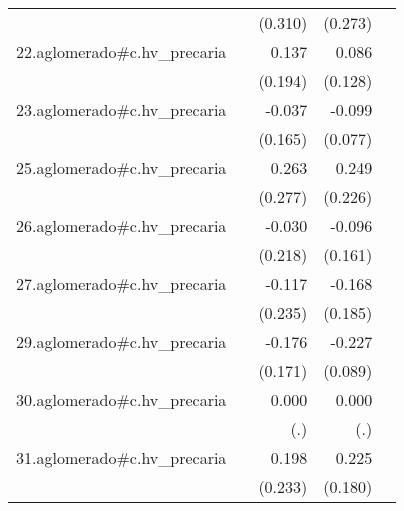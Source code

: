 {\begin{longtable}{l*{4}{D{.}{.}{-1}}}
            &                     &     (0.310)         &     (0.273)         &                     \\
\addlinespace
22.aglomerado#c.hv\_precaria&                     &       0.137         &       0.086         &                     \\
            &                     &     (0.194)         &     (0.128)         &                     \\
\addlinespace
23.aglomerado#c.hv\_precaria&                     &      -0.037         &      -0.099         &                     \\
            &                     &     (0.165)         &     (0.077)         &                     \\
\addlinespace
25.aglomerado#c.hv\_precaria&                     &       0.263         &       0.249         &                     \\
            &                     &     (0.277)         &     (0.226)         &                     \\
\addlinespace
26.aglomerado#c.hv\_precaria&                     &      -0.030         &      -0.096         &                     \\
            &                     &     (0.218)         &     (0.161)         &                     \\
\addlinespace
27.aglomerado#c.hv\_precaria&                     &      -0.117         &      -0.168         &                     \\
            &                     &     (0.235)         &     (0.185)         &                     \\
\addlinespace
29.aglomerado#c.hv\_precaria&                     &      -0.176         &      -0.227\sym{*}  &                     \\
            &                     &     (0.171)         &     (0.089)         &                     \\
\addlinespace
30.aglomerado#c.hv\_precaria&                     &       0.000         &       0.000         &                     \\
            &                     &         (.)         &         (.)         &                     \\
\addlinespace
31.aglomerado#c.hv\_precaria&                     &       0.198         &       0.225         &                     \\
            &                     &     (0.233)         &     (0.180)         &                     \\

\end{longtable}}
